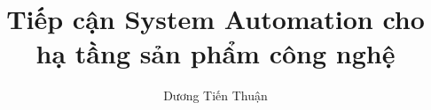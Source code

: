 \documentclass[14pt,a4paper,oneside,fleqn,openright]{extbook}
\renewcommand{\baselinestretch}{1.50}\normalsize
\begin{document}
\author{Dương Tiến Thuận}
\title{Tiếp cận System Automation cho hạ tầng sản phẩm công nghệ}

\frontmatter
\pagestyle{empty}


\newpage


\renewcommand{\baselinestretch}{1}\normalsize

\tableofcontents
\listoffigures
\listoftables

\renewcommand{\baselinestretch}{1.50}\normalsize
\mainmatter
\pagestyle{fancy}
\newpage


\newpage


\newpage


\backmatter
\pagestyle{empty}


\newpage

\end{document}
